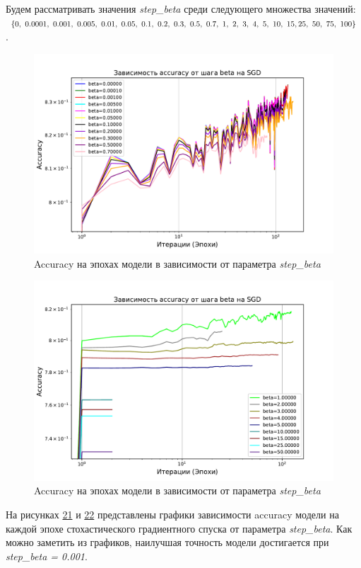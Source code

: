 \documentclass[14pt]{extarticle}
\begin{document}
Будем рассматривать значения \textit{step\_beta} среди следующего множества значений: \( \{0, \ 0.0001, \ 0.001, \ 0.005, \ 0.01, \ 0.05, \ 0.1, \ 0.2, \ 0.3, \ 0.5, \ 0.7, \ 1, \ 2, \ 3, \ 4, \ 5, \ 10, \ 15, \\ 25, \ 50, \ 75, \ 100\} \).

\begin{figure}[H]
    \centering
    \includegraphics[width=0.7\linewidth]
    {exp_5_acc_beta_1.pdf}
    \caption{Accuracy на эпохах модели в зависимости от параметра \textit{step\_beta}}
    \label{fig:exp_5_acc_beta_1}
\end{figure}

\begin{figure}[H]
    \centering
    \includegraphics[width=0.7\linewidth]
    {exp_5_acc_beta_2.pdf}
    \caption{Accuracy на эпохах модели в зависимости от параметра \textit{step\_beta}}
    \label{fig:exp_5_acc_beta_2}
\end{figure}

На рисунках \hyperref[fig:exp_5_acc_beta_1]{21} и \hyperref[fig:exp_5_acc_beta_2]{22} представлены графики зависимости accuracy модели на каждой эпохе стохастического градиентного спуска от параметра \textit{step\_beta}. Как можно заметить из графиков, наилучшая точность модели достигается при \textit{step\_beta = 0.001}.
\end{document}
